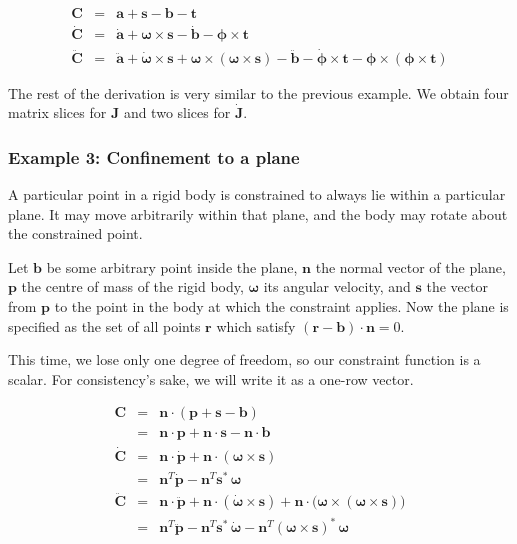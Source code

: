 \begin{eqnarray}
\mathbf{C} &=& \mathbf{a} + \mathbf{s} - \mathbf{b} - \mathbf{t} \\
\dot{\mathbf{C}} &=& \dot{\mathbf{a}} + \bm{\omega}\times\mathbf{s} -
    \dot{\mathbf{b}} - \bm{\phi}\times\mathbf{t} \\
\ddot{\mathbf{C}} &=& \ddot{\mathbf{a}} + \dot{\bm{\omega}}\times\mathbf{s} +
    \bm{\omega}\times(\bm{\omega}\times\mathbf{s}) -
    \ddot{\mathbf{b}} - \dot{\bm{\phi}}\times\mathbf{t} -
    \bm{\phi}\times(\bm{\phi}\times\mathbf{t})
\end{eqnarray}

The rest of the derivation is very similar to the previous example. We obtain four
matrix slices for $\mathbf{J}$ and two slices for $\dot{\mathbf{J}}$.


\subsubsection{Example 3: Confinement to a plane}

A particular point in a rigid body is constrained to always lie within a particular plane.
It may move arbitrarily within that plane, and the body may rotate about the constrained point.

Let $\mathbf{b}$ be some arbitrary point inside the plane, $\mathbf{n}$ the normal vector of
the plane, $\mathbf{p}$ the centre of mass of the rigid body, $\bm{\omega}$ its angular
velocity, and $\mathbf{s}$ the vector from $\mathbf{p}$ to the point in the body at which the
constraint applies. Now the plane is specified as the set of all points $\mathbf{r}$ which
satisfy $(\mathbf{r} - \mathbf{b})\cdot\mathbf{n} = 0$.

This time, we lose only one degree of freedom, so our constraint function is a scalar. For
consistency's sake, we will write it as a one-row vector.

\begin{eqnarray}
\mathbf{C} &=& \mathbf{n}\cdot(\mathbf{p} + \mathbf{s} - \mathbf{b}) \nonumber\\
&=& \mathbf{n}\cdot\mathbf{p} + \mathbf{n}\cdot\mathbf{s} - \mathbf{n}\cdot\mathbf{b} \\
\dot{\mathbf{C}} & = & \mathbf{n}\cdot\dot{\mathbf{p}} +
    \mathbf{n}\cdot(\bm{\omega}\times\mathbf{s}) \nonumber\\
&=& \mathbf{n}^T\dot{\mathbf{p}} - \mathbf{n}^T \mathbf{s}^*\,\bm{\omega} \\
\ddot{\mathbf{C}} &=& \mathbf{n}\cdot\ddot{\mathbf{p}} +
    \mathbf{n}\cdot(\dot{\bm{\omega}}\times\mathbf{s}) +
    \mathbf{n}\cdot\big(\bm{\omega}\times(\bm{\omega}\times\mathbf{s})\big) \nonumber\\
&=& \mathbf{n}^T\ddot{\mathbf{p}} - \mathbf{n}^T \mathbf{s}^*\,\dot{\bm{\omega}} -
    \mathbf{n}^T (\bm{\omega}\times\mathbf{s})^*\,\bm{\omega}
\end{eqnarray}

